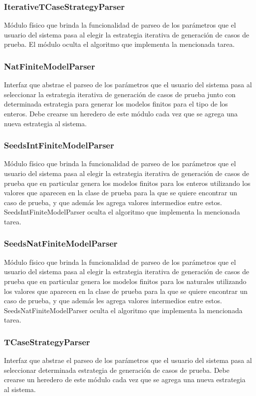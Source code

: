 \documentclass[a4paper,10pt]{report}
\begin{document}
			\subsubsection{IterativeTCaseStrategyParser}
			Módulo físico que brinda la funcionalidad de parseo de los parámetros que el usuario del sistema pasa al elegir la estrategia iterativa de generación de casos de prueba. El módulo oculta el algoritmo que implementa la mencionada tarea.
			\subsubsection{NatFiniteModelParser}
			Interfaz que abstrae el parseo de los parámetros que el usuario del sistema pasa al seleccionar la estrategia iterativa de generación de casos de prueba junto con determinada estrategia para generar los modelos finitos para el tipo de los enteros. Debe crearse un heredero de este módulo cada vez que se agrega una nueva estrategia al sistema.
			\subsubsection{SeedsIntFiniteModelParser}
			Módulo físico que brinda la funcionalidad de parseo de los parámetros que el usuario del sistema pasa al elegir la estrategia iterativa de generación de casos de prueba que en particular genera los modelos finitos para los enteros utilizando los valores que aparecen en la clase de prueba para la que se quiere encontrar un caso de prueba, y que además les agrega valores intermedios entre estos. SeedsIntFiniteModelParser oculta el algoritmo que implementa la mencionada tarea.
			\subsubsection{SeedsNatFiniteModelParser}
			Módulo físico que brinda la funcionalidad de parseo de los parámetros que el usuario del sistema pasa al elegir la estrategia iterativa de generación de casos de prueba que en particular genera los modelos finitos para los naturales utilizando los valores que aparecen en la clase de prueba para la que se quiere encontrar un caso de prueba, y que además les agrega valores intermedios entre estos. SeedsNatFiniteModelParser oculta el algoritmo que implementa la mencionada tarea.
			\subsubsection{TCaseStrategyParser}
			Interfaz que abstrae el parseo de los parámetros que el usuario del sistema pasa al seleccionar determinada estrategia de generación de casos de prueba. Debe crearse un heredero de este módulo cada vez que se agrega una nueva estrategia al sistema.
\end{document}
